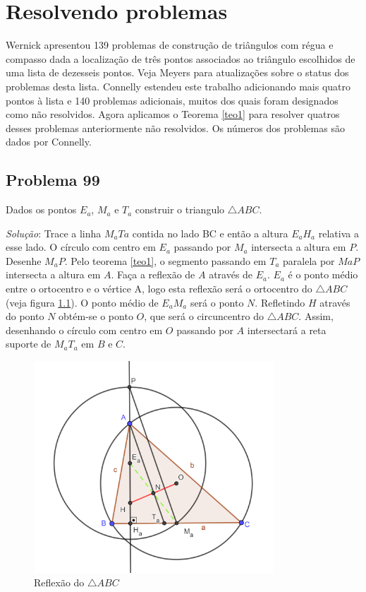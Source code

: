 \documentclass[12pt, openright, a4paper, brazil, openany, oneside]{abntex2}
\begin{document}
\chapter{Resolvendo problemas}

Wernick\cite{Wernick} apresentou 139 problemas de construção de triângulos com régua e compasso dada a localização de três pontos associados ao triângulo escolhidos de uma lista de dezesseis pontos. Veja Meyers\cite{Meyers} para atualizações sobre o status dos problemas desta lista. Connelly \cite{con} estendeu este trabalho adicionando mais quatro pontos à lista e 140 problemas adicionais, muitos dos quais foram designados como não resolvidos. Agora aplicamos o Teorema \ref{teo1} para resolver quatros desses problemas anteriormente não resolvidos. Os números dos problemas são dados por Connelly.

\section{Problema 99}

Dados os pontos $E_a$, $M_a$ e $T_a$ construir o triangulo $\triangle ABC$.

\textit{Solução}: Trace a linha $M_{a}T{a}$ contida no lado BC e então a altura $E_{a}H_{a}$ relativa a esse lado. O círculo com centro em $E_{a}$ passando por $M_{a}$ intersecta a altura em $P$. Desenhe $M_{a}P$. Pelo teorema \ref{teo1}, o segmento passando em $T_{a}$ paralela por $M{a}P$ intersecta a altura em $A$. Faça a reflexão de $A$ através de $E_{a}$. $E_{a}$ é o ponto médio entre o ortocentro e o vértice A, logo esta reflexão será o ortocentro do $\triangle ABC$ (veja figura \ref{trianexer}). O ponto médio de $E_{a}M_{a}$ será o ponto $N$. Refletindo $H$ através do ponto $N$ obtém-se o ponto $O$, que será o circuncentro do $\triangle ABC$. Assim, desenhando o círculo com centro em $O$ passando por $A$ intersectará a reta suporte de $M_{a}T_{a}$ em $B$ e $C$. 

\begin{figure}[h]
	
	\center
	
	\includegraphics[width=9cm]{triangexer.png}
	\caption{Reflexão do $\triangle ABC$ \label{trianexer}}
	
\end{figure}
\end{document}
